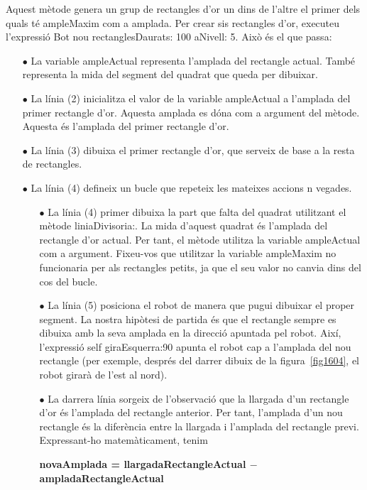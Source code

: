Aquest mètode genera un grup de rectangles d'or un dins de l'altre el primer dels quals té \textsf{ampleMaxim} com a amplada. Per crear sis rectangles d'or, executeu l'expressió \textsf{Bot nou rectanglesDaurats: 100 aNivell: 5}. Això és el que passa:
\begin{itemize}
\item[$\bullet$] La variable \textsf{ampleActual} representa l'amplada del rectangle actual. També representa la mida del segment del quadrat que queda per dibuixar.
\item[$\bullet$] La línia \textsf{(2)} inicialitza el valor de la variable \textsf{ampleActual} a l'amplada del primer rectangle d'or. Aquesta amplada es dóna com a argument del mètode. Aquesta és l'amplada del primer rectangle d'or.
\item[$\bullet$] La línia \textsf{(3)} dibuixa el primer rectangle d'or, que serveix de base a la resta de rectangles.
\item[$\bullet$] La línia \textsf{(4)} defineix un bucle que repeteix les mateixes accions \textsf{n} vegades. \begin{itemize}
\item[$\bullet$] La línia \textsf{(4)} primer dibuixa la part que falta del quadrat utilitzant el mètode \textsf{liniaDivisoria:}. La mida d'aquest quadrat és l'amplada del rectangle d'or actual. Per tant, el mètode utilitza la variable \textsf{ampleActual} com a argument. Fixeu-vos que utilitzar la variable \textsf{ampleMaxim} no funcionaria per als rectangles petits, ja que el seu valor no canvia dins del cos del bucle.
\item[$\bullet$] La línia \textsf{(5)} posiciona el robot de manera que pugui dibuixar el proper segment. La nostra hipòtesi de partida és que el rectangle sempre es dibuixa amb la seva amplada en la direcció apuntada pel robot. Així, l'expressió \textsf{self giraEsquerra:90} apunta el robot cap a l'amplada del nou rectangle (per exemple, després del darrer dibuix de la figura~\ref{fig1604}, el robot girarà de l'est al nord).
\item[$\bullet$] La darrera línia sorgeix de l'observació que la llargada d'un rectangle d'or és l'amplada del rectangle anterior. Per tant, l'amplada d'un nou rectangle és la diferència entre la llargada i l'amplada del rectangle previ. Expressant-ho matemàticament, tenim
\vspace*{2mm}

\noindent
{\bf novaAmplada = llargadaRectangleActual $-$ ampladaRectangleActual}


\end{itemize}
\end{itemize}
